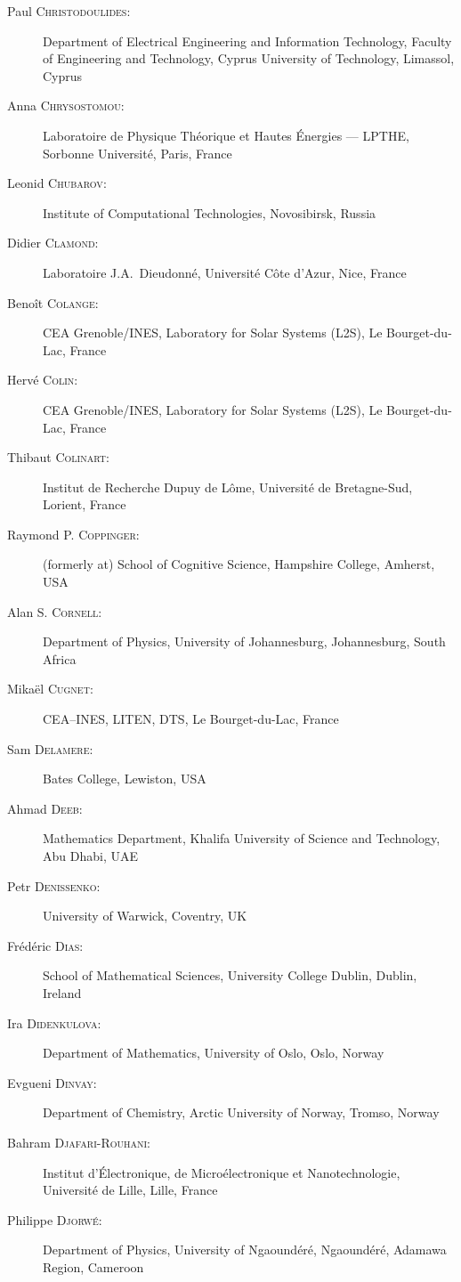 \documentclass[final, a4paper, oneside, 12pt]{article}
\numberwithin{equation}{section}
\begin{document}
\begin{description}
  \item[Paul \textsc{Christodoulides}:] Department of Electrical Engineering and Information Technology, Faculty of Engineering and Technology, Cyprus University of Technology, Limassol, Cyprus
  \item[Anna \textsc{Chrysostomou}:] Laboratoire de Physique Th\'eorique et Hautes \'Energies --- LPTHE, Sorbonne Universit\'e, Paris, France
  \item[Leonid \textsc{Chubarov}:] Institute of Computational Technologies, Novosibirsk, Russia
  \item[Didier \textsc{Clamond}:] Laboratoire J.A.~Dieudonn\'e, Universit\'e C\^ote d'Azur, Nice, France
  \item[Beno\^it \textsc{Colange}:] CEA Grenoble/INES, Laboratory for Solar Systems (L2S), Le Bourget-du-Lac, France
  \item[Herv\'e \textsc{Colin}:] CEA Grenoble/INES, Laboratory for Solar Systems (L2S), Le Bourget-du-Lac, France
  \item[Thibaut \textsc{Colinart}:] Institut de Recherche Dupuy de L\^ome, Universit\'e de Bretagne-Sud, Lorient, France
  \item[Raymond P. \textsc{Coppinger}:] (formerly at) School of Cognitive Science, Hampshire College, Amherst, USA
  \item[Alan S. \textsc{Cornell}:] Department of Physics, University of Johannesburg, Johannesburg, South Africa
  \item[Mika\"el \textsc{Cugnet}:] CEA--INES, LITEN, DTS, Le Bourget-du-Lac, France
  \item[Sam \textsc{Delamere}:] Bates College, Lewiston, USA
  \item[Ahmad \textsc{Deeb}:] Mathematics Department, Khalifa University of Science and Technology, Abu Dhabi, UAE
  \item[Petr \textsc{Denissenko}:] University of Warwick, Coventry, UK
  \item[Fr\'ed\'eric \textsc{Dias}:] School of Mathematical Sciences, University College Dublin, Dublin, Ireland
  \item[Ira \textsc{Didenkulova}:] Department of Mathematics, University of Oslo, Oslo, Norway
  \item[Evgueni \textsc{Dinvay}:] Department of Chemistry, Arctic University of Norway, Tromso, Norway
  \item[Bahram \textsc{Djafari-Rouhani}:] Institut d'\'Electronique, de Micro\'electronique et Nanotechnologie, Universit\'e de Lille, Lille, France
  \item[Philippe \textsc{Djorw\'e}:] Department of Physics, University of Ngaound\'er\'e, Ngaoundéré, Adamawa Region, Cameroon

\end{description}
\end{document}

